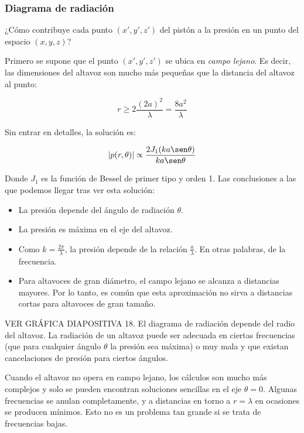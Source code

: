 \documentclass[12pt, a4paper]{article}
\begin{document}
\subsubsection{Diagrama de radiación}

¿Cómo contribuye cada punto $\left( x', y', z' \right)$ del pistón a la presión en un punto del espacio $\left( x, y, z \right)$?

Primero se supone que el punto $\left( x', y', z' \right)$ se ubica en \textit{campo lejano}. Es decir, las dimensiones del altavoz son mucho más pequeñas que la distancia del altavoz al punto:

\begin{equation} \label{eq:campo_lejano}
    r \geq 2 \frac{\left( 2a \right)^2}{\lambda} = \frac{8a^2}{\lambda}    
\end{equation}

Sin entrar en detalles, la solución es:

\begin{equation} \label{eq:presion_punto}
    \abs{p(r,\theta)} \propto \frac{2 J_1(ka \sen \theta)}{ka \sen \theta}
\end{equation}

Donde $J_1$ es la función de Bessel de primer tipo y orden 1. Las conclusiones a las que podemos llegar tras ver esta solución:

\begin{itemize}
    \item La presión depende del ángulo de radiación $\theta$.
    \item La presión es máxima en el eje del altavoz.
    \item Como $k= \frac{2\pi}{\lambda}$, la presión depende de la relación $\frac{a}{\lambda}$. En otras palabras, de la frecuencia.
    \item Para altavoces de gran diámetro, el campo lejano se alcanza a distancias mayores. Por lo tanto, es común que esta aproximación no sirva a distancias cortas para altavoces de gran tamaño.
\end{itemize}

VER GRÁFICA DIAPOSITIVA 18. El diagrama de radiación depende del radio del altavoz. La radiación de un altavoz puede ser adecuada en ciertas frecuencias (que para cualquier ángulo $\theta$ la presión sea máxima) o muy mala y que existan cancelaciones de presión para ciertos ángulos.

Cuando el altavoz no opera en campo lejano, los cálculos son mucho más complejos y solo se pueden encontran soluciones sencillas en el eje $\theta=0$. Algunas frecuencias se anulan completamente, y a distancias en torno a $r=\lambda$ en ocasiones se producen mínimos. Esto no es un problema tan grande si se trata de frecuencias bajas.
\end{document}
